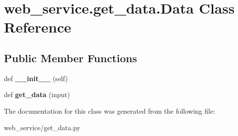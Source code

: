 \hypertarget{classweb__service_1_1get__data_1_1_data}{}\section{web\+\_\+service.\+get\+\_\+data.\+Data Class Reference}
\label{classweb__service_1_1get__data_1_1_data}
\subsection*{Public Member Functions}
\begin{DoxyCompactItemize}
\item 
\mbox{\label{classweb__service_1_1get__data_1_1_data_af313165f79ee0dbf27f6ed24ca775d50}} 
def {\bfseries \+\_\+\+\_\+init\+\_\+\+\_\+} (self)
\item 
\mbox{\label{classweb__service_1_1get__data_1_1_data_a0db42a21a20452264f21878ed252e9f0}} 
def {\bfseries get\+\_\+data} (input)
\end{DoxyCompactItemize}


The documentation for this class was generated from the following file\+:\begin{DoxyCompactItemize}
\item 
web\+\_\+service/get\+\_\+data.\+py\end{DoxyCompactItemize}
